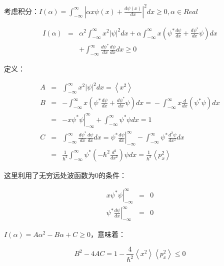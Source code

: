 考虑积分：$I(\alpha ) = \int_{ - \infty }^\infty  {\left| {\alpha x\psi (x) + \frac{{d\psi (x)}}{{dx}}} \right|^2 dx}  \ge 0,\alpha  \in Real$

\begin{eqnarray*}
I(\alpha ) & = & \alpha ^2 \int_{ - \infty }^\infty  {x^2 \left| \psi  \right|^2 dx}  + \alpha \int_{ - \infty }^\infty  {x\left( {\psi ^* \frac{{d\psi }}{{dx}} + \frac{{d\psi ^* }}{{dx}}\psi } \right)dx}  \\
{} & {} & + \int_{ - \infty }^\infty  {\frac{{d\psi ^* }}{{dx}}\frac{{d\psi }}{{dx}}dx}  \ge 0
\end{eqnarray*}

定义：

\begin{eqnarray*}
A & = & \int_{ - \infty }^\infty  {x^2 \left| \psi  \right|^2 dx}  = \left\langle {x^2 } \right\rangle \\
B & = & - \int_{ - \infty }^\infty  {x\left( {\psi ^* \frac{{d\psi }}{{dx}} + \frac{{d\psi ^* }}{{dx}}\psi } \right)dx = }  - \int_{ - \infty }^\infty  {x\frac{d}{{dx}}\left( {\psi ^* \psi } \right)dx}  \\ 
{} & = & - \left. {x\psi ^* \psi } \right|_{ - \infty }^\infty   + \int_{ - \infty }^\infty  {\psi ^* \psi dx}  = 1 \\
C & = & \int_{ - \infty }^\infty  {\frac{{d\psi ^* }}{{dx}}\frac{{d\psi }}{{dx}}dx}  = \left. {\psi ^* \frac{{d\psi }}{{dx}}} \right|_{ - \infty }^\infty   - \int_{ - \infty }^\infty  {\psi ^* \frac{{d^2 \psi }}{{dx^2 }}dx} \\
{} &= & \frac{1}{{\hbar ^2 }}\int_{ - \infty }^\infty  {\psi ^* \left( { - \hbar ^2 \frac{{d^2 }}{{dx^2 }}} \right)\psi dx}  = \frac{1}{{\hbar ^2 }}\left\langle {p_x ^2 } \right\rangle 
\end{eqnarray*}

这里利用了无穷远处波函数为$0$的条件：

\begin{eqnarray*}
\left. {x\psi ^* \psi } \right|_{ - \infty }^\infty  & = & 0 \\
\left. {\psi ^* \frac{{d\psi }}{{dx}}} \right|_{ - \infty }^\infty & = & 0
\end{eqnarray*}

$I(\alpha ) = A\alpha ^2  - B\alpha  + C \ge 0$，意味着：

\begin{equation*}
B^2  - 4AC = 1 - \frac{4}{{\hbar ^2 }}\left\langle {x^2 } \right\rangle \left\langle {p_x ^2 } \right\rangle  \le 0
\end{equation*}

